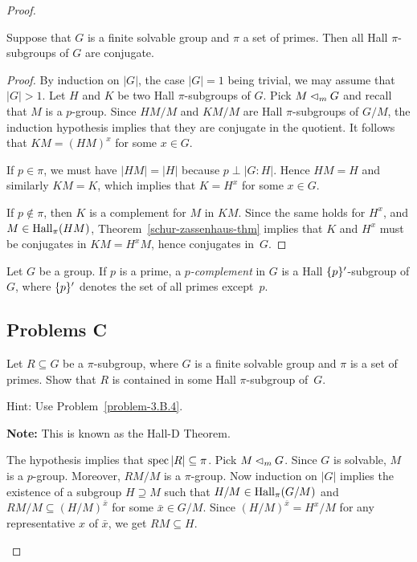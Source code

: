 \begin{proof}
\begin{thm}\label{hall-c}{\upshape[Hall-C]}
    Suppose that\/ $G$ is a finite solvable group and $\pi$ a set of primes. Then all Hall\/ $\pi$-subgroups of\/ $G$ are conjugate.
\end{thm}

\begin{proof} By induction on $|G|$, the case $|G|=1$ being trivial, we may assume that $|G|>1$. Let $H$ and $K$ be two Hall $\pi$-subgroups of $G$. Pick $M\lhd_mG$ and recall that $M$ is a $p$-group. Since $HM/M$ and $KM/M$ are Hall $\pi$-subgroups of $G/M$, the induction hypothesis implies that they are conjugate in the quotient. It follows that $KM=(HM)^x$ for some $x\in G$.

If $p\in\pi$, we must have $|HM|=|H|$ because $p\perp|G:H|$. Hence $HM=H$ and similarly $KM=K$, which implies that $K=H^x$ for some $x\in G$.

If $p\notin\pi$, then $K$ is a complement for $M$ in $KM$. Since the same holds for $H^x$, and $M\in{\rm Hall}_{\pi}(HM)$, Theorem~\ref{schur-zassenhaus-thm} implies that $K$ and $H^x$ must be conjugates in $KM=H^xM$, hence conjugates in~$G$.  \end{proof}

\begin{defn}
    Let\/ $G$ be a group. If\/ $p$ is a prime, a \textsl{$p$-complement} in\/ $G$ is a Hall\/ $\{p\}'$-subgroup of\/ $G$, where\/ $\{p\}'$ denotes the set of all primes except\/~$p$. 
\end{defn}

\subsection{Problems C}

\begin{probl}\label{problem-3.C.1}
    Let\/ $R\subseteq G$ be a\/ $\pi$-subgroup, where\/ $G$ is a finite solvable group and\/ $\pi$ is a set of primes. Show that\/ $R$ is contained in some Hall\/ $\pi$-subgroup of\/~$G$.

    {\upshape Hint: Use Problem~\ref{problem-3.B.4}}.
    
    \textrm{\normalfont\textbf{Note:} This is known as the Hall-D Theorem}.
\end{probl}

\begin{solution} The hypothesis implies that $\operatorname{spec}|R|\subseteq\pi$. Pick $M\lhd_mG$. Since\/ $G$ is solvable, $M$ is a\/ $p$-group. Moreover, $RM/M$ is a\/ $\pi$-group. Now induction on $|G|$ implies the existence of a subgroup $H\supseteq M$ such that $H/M\in{\rm Hall}_\pi(G/M)$ and $RM/M\subseteq(H/M)^{\bar x}$ for some $\bar x\in G/M$. Since $(H/M)^{\bar x}=H^x/M$ for any representative $x$ of $\bar x$, we get $RM\subseteq H$.


\end{solution}
\end{proof}
